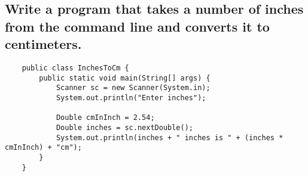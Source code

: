 \documentclass{article}
\begin{document}
    \subsection{Write a program that takes a number of inches from the command line and converts it to centimeters.}

    \begin{verbatim}
    public class InchesToCm {
        public static void main(String[] args) {
            Scanner sc = new Scanner(System.in);
            System.out.println("Enter inches");
            
            Double cmInInch = 2.54;
            Double inches = sc.nextDouble();
            System.out.println(inches + " inches is " + (inches * cmInInch) + "cm");
        }
    }
    \end{verbatim}
\end{document}
